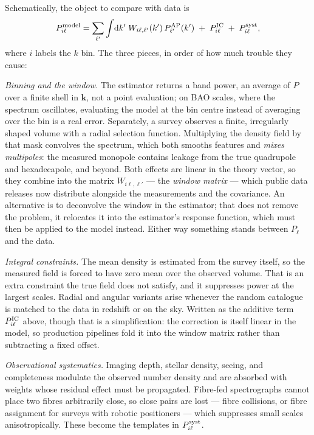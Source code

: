 \documentclass[a4paper,11pt]{article}
\newcommand{\vk}{\bm{k}}
\newcommand{\dd}{\mathrm{d}}
\numberwithin{equation}{section}
\begin{document}
Schematically, the object to compare with data is
\begin{equation}
P^{\rm model}_{i\ell}
= \sum_{\ell'}\int\!\dd k'\;W_{i\ell,\ell'}(k')\,P^{\rm AP}_{\ell'}(k')
\;+\; P^{\rm IC}_{i\ell} \;+\; P^{\rm syst}_{i\ell} ,
\label{eq:window}
\end{equation}
where $i$ labels the $k$ bin. The three pieces, in order of how much trouble
they cause:

\emph{Binning and the window.} The estimator returns a band power, an average of
$P$ over a finite shell in $\vk$, not a point evaluation; on BAO scales, where
the spectrum oscillates, evaluating the model at the bin centre instead of
averaging over the bin is a real error. Separately, a survey observes a finite,
irregularly shaped volume with a radial selection function. Multiplying the
density field by that mask convolves the spectrum, which both smooths features
and \emph{mixes multipoles}: the measured monopole contains leakage from the
true quadrupole and hexadecapole, and beyond. Both effects are linear in the
theory vector, so they combine into the matrix $W_{i\ell,\ell'}$ --- the
\emph{window matrix} --- which public data releases now distribute alongside the
measurements and the covariance. An alternative is to deconvolve the window in
the estimator; that does not remove the problem, it relocates it into the
estimator's response function, which must then be applied to the model instead.
Either way something stands between $P_\ell$ and the data.

\emph{Integral constraints.} The mean density is estimated from the survey
itself, so the measured field is forced to have zero mean over the observed
volume. That is an extra constraint the true field does not satisfy, and it
suppresses power at the largest scales. Radial and angular variants arise
whenever the random catalogue is matched to the data in redshift or on the sky.
Written as the additive term $P^{\rm IC}_{i\ell}$ above, though that is a simplification: the correction is itself linear in the model, so production pipelines fold it into the window matrix rather than subtracting a fixed offset.

\emph{Observational systematics.} Imaging depth, stellar density, seeing, and
completeness modulate the observed number density and are absorbed with weights
whose residual effect must be propagated. Fibre-fed spectrographs cannot place
two fibres arbitrarily close, so close pairs are lost --- fibre collisions, or
fibre assignment for surveys with robotic positioners --- which suppresses small
scales anisotropically. These become the templates in $P^{\rm syst}_{i\ell}$.
\end{document}
